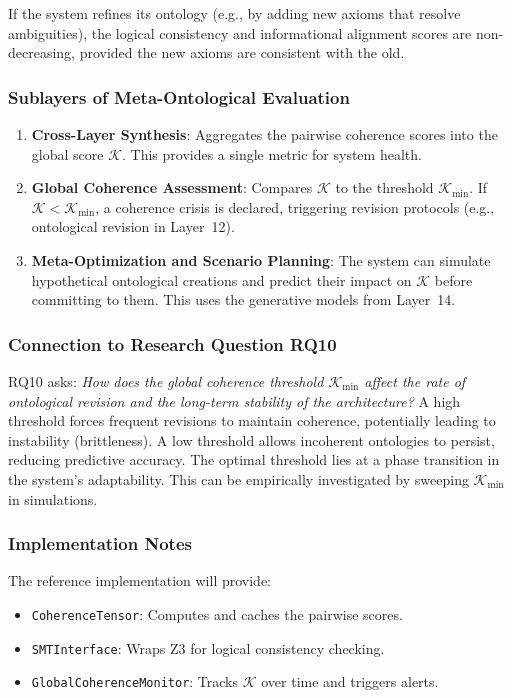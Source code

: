 \begin{proposition}
If the system refines its ontology (e.g., by adding new axioms that resolve ambiguities), the logical consistency and informational alignment scores are non-decreasing, provided the new axioms are consistent with the old.
\end{proposition}

\subsubsection{Sublayers of Meta-Ontological Evaluation}
\begin{enumerate}
    \item \textbf{Cross-Layer Synthesis}: Aggregates the pairwise coherence scores into the global score $\mathcal{K}$. This provides a single metric for system health.
    \item \textbf{Global Coherence Assessment}: Compares $\mathcal{K}$ to the threshold $\mathcal{K}_{\text{min}}$. If $\mathcal{K} < \mathcal{K}_{\text{min}}$, a coherence crisis is declared, triggering revision protocols (e.g., ontological revision in Layer~12).
    \item \textbf{Meta-Optimization and Scenario Planning}: The system can simulate hypothetical ontological creations and predict their impact on $\mathcal{K}$ before committing to them. This uses the generative models from Layer~14.
\end{enumerate}

\subsubsection{Connection to Research Question RQ10}
RQ10 asks: \emph{How does the global coherence threshold $\mathcal{K}_{\text{min}}$ affect the rate of ontological revision and the long-term stability of the architecture?} A high threshold forces frequent revisions to maintain coherence, potentially leading to instability (brittleness). A low threshold allows incoherent ontologies to persist, reducing predictive accuracy. The optimal threshold lies at a phase transition in the system's adaptability. This can be empirically investigated by sweeping $\mathcal{K}_{\text{min}}$ in simulations.

\subsubsection{Implementation Notes}
The reference implementation will provide:
\begin{itemize}
    \item \texttt{CoherenceTensor}: Computes and caches the pairwise scores.
    \item \texttt{SMTInterface}: Wraps Z3 for logical consistency checking.
    \item \texttt{GlobalCoherenceMonitor}: Tracks $\mathcal{K}$ over time and triggers alerts.
\end{itemize}

